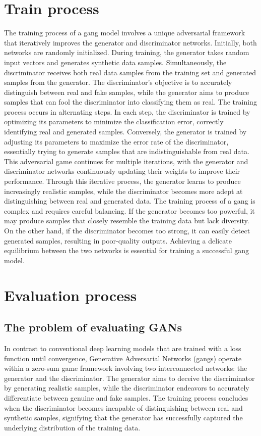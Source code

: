 \section{Train process}
\label{sec:train-gan-model}
The training process of a \gls{gang} model involves a unique adversarial framework that iteratively improves the generator and discriminator networks. 
Initially, both networks are randomly initialized. During training, the generator takes random input vectors and generates synthetic data samples. 
Simultaneously, the discriminator receives both real data samples from the training set and generated samples from the generator. 
The discriminator's objective is to accurately distinguish between real and fake samples, while the generator aims to produce samples that can fool the discriminator into classifying them as real.
The training process occurs in alternating steps. In each step, the discriminator is trained by optimizing its parameters to minimize the classification error, correctly identifying real and generated samples. 
Conversely, the generator is trained by adjusting its parameters to maximize the error rate of the discriminator, essentially trying to generate samples that are indistinguishable from real data.
This adversarial game continues for multiple iterations, with the generator and discriminator networks continuously updating their weights to improve their performance. 
Through this iterative process, the generator learns to produce increasingly realistic samples, while the discriminator becomes more adept at distinguishing between real and generated data.
The training process of a \gls{gang} is complex and requires careful balancing. If the generator becomes too powerful, it may produce samples that closely resemble the training data but lack diversity. 
On the other hand, if the discriminator becomes too strong, it can easily detect generated samples, resulting in poor-quality outputs. Achieving a delicate equilibrium between the two networks is essential for training a successful \gls{gang} model.

\section{Evaluation process}
\label{sec:Evaluation-gan-model}
\subsection{The problem of evaluating GANs}
\label{subsec:problem-evaluating-gans}
In contrast to conventional deep learning models that are trained with a loss function until convergence, Generative Adversarial Networks (\gls{gang}s) operate within a zero-sum game framework involving two interconnected networks: the generator and the discriminator. 
The generator aims to deceive the discriminator by generating realistic samples, while the discriminator endeavors to accurately differentiate between genuine and fake samples. 
The training process concludes when the discriminator becomes incapable of distinguishing between real and synthetic samples, signifying that the generator has successfully captured the underlying distribution of the training data.

